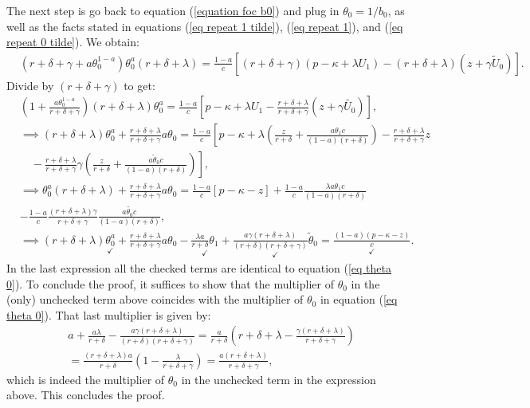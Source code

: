 \documentclass[12pt]{article} %
\theoremstyle{definition}
\begin{document}
\begin{appendix}
The next step is go back to equation (\ref{equation foc b0}) and plug in $\theta_0 = {1}/{b_0}$, as well as the facts stated in equations (\ref{eq repeat 1 tilde}), (\ref{eq repeat 1}), and (\ref{eq repeat 0 tilde}). We obtain:
\begin{align*}
& (r+\delta+\gamma+a\theta_0^{1-a})\theta_0^a(r+\delta+\lambda) = \frac{1-a}{c} [(r+\delta+\gamma)(p-\kappa+\lambda U_1) - (r+\delta+\lambda)(z+\gamma \tilde{U}_0)]. 
\end{align*}
Divide by $(r+\delta+\gamma)$ to get: 
\begin{align*}
& \left(1+\frac{a\theta_0^{1-a}}{r+\delta+\gamma}\right)(r+\delta+\lambda)\theta_0^a = \frac{1-a}{c} \left[p-\kappa+\lambda U_1 
 - \frac{r+\delta+\lambda}{r+\delta+\gamma}(z+\gamma \tilde{U_0}) \right], \\
&\implies (r+\delta+\lambda) \theta_0^a + \frac{r+\delta+\lambda}{r+\delta+\gamma} a \theta_0 = \frac{1-a}{c} \left[p - \kappa + \lambda \left( \frac{z}{r+\delta} + \frac{a \theta_1 c}{(1-a)(r+\delta)} \right) - \frac{r+\delta+\lambda}{r+\delta+\gamma} z \right. \\
& \left. \quad - \frac{r+\delta+\lambda}{r+\delta+\gamma} \gamma \left( \frac{z}{r+\delta} + \frac{a \tilde{\theta}_0 c}{(1-a)(r+\delta)} \right) \right], \\
&\implies \theta_0^a (r+\delta+\lambda) + \frac{r+\delta+\lambda}{r+\delta+\gamma} a \theta_0 = \frac{1-a}{c} [p - \kappa - z] + \frac{1-a}{c} \frac{\lambda a \theta_1 c}{(1-a)(r+\delta)} \\
& - \frac{1-a}{c}\frac{(r+\delta+\lambda)\gamma}{r+\delta+\gamma} \frac{a \tilde{\theta_0}c}{(1-a)(r+\delta)},\\
& \implies (r+\delta+\lambda) \underset{\checkmark}{\theta_0^a} + \frac{r+\delta+\lambda}{r+\delta+\gamma} a \theta_0 - \underset{\checkmark}{\frac{\lambda a}{r+\delta}\theta_1} + \underset{\checkmark}{\frac{a\gamma(r+\delta+\lambda)}{(r+\delta)(r+\delta+\gamma)}\tilde{\theta}_0} = \underset{\checkmark}{\frac{(1-a)(p-\kappa-z)}{c}}.
\end{align*}
In the last expression all the checked terms are identical to equation (\ref{eq theta 0}). To conclude the proof, it suffices to show that the multiplier of $\theta_0$ in the (only) unchecked term above coincides with the multiplier of $\theta_0$ in equation (\ref{eq theta 0}). That last multiplier is given by: 
\begin{align*}
& a + \frac{a\lambda}{r+\delta} - \frac{a\gamma(r+\delta+\lambda)}{(r+\delta)(r+\delta+\gamma)} = \frac{a}{r+\delta} \left(r+\delta+\lambda-\frac{\gamma(r+\delta+\lambda)}{r+\delta+\gamma} \right) \\
& = \frac{(r+\delta+\lambda)a}{r+\delta}\left(1-\frac{\lambda}{r+\delta+\gamma}\right) =  \frac{a(r+\delta+\lambda)}{r+\delta+\gamma}, 
\end{align*}
which is indeed the multiplier of $\theta_0$ in the unchecked term in the expression above. This concludes the proof.  



\end{appendix}
\end{document}
